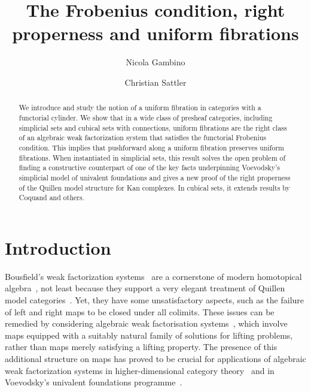 \documentclass[reqno,10pt,a4paper,oneside,draft]{amsart}
\title{The Frobenius condition, right properness \linebreak and uniform fibrations}
\begin{document}
\begin{abstract}
We introduce and study the notion of a uniform fibration in categories with a functorial cylinder.
We show that in a wide class of presheaf categories, including simplicial sets and cubical sets with connections, uniform fibrations are the right class of an algebraic weak factorization system that satisfies the functorial Frobenius condition.
This implies that pushforward along a uniform fibration preserves uniform fibrations.
When instantiated in simplicial sets, this result solves the open problem of finding a constructive counterpart of one of the key facts underpinning Voevodsky's simplicial model of univalent foundations and gives a new proof of the right properness of the Quillen model structure for Kan complexes.
In cubical sets, it extends results by Coquand and others.
\end{abstract}

\author{Nicola Gambino}
\address{School of Mathematics, University of Leeds, Leeds LS2 9JT, UK}

\author{Christian Sattler}
\address{School of Mathematics, University of Leeds, Leeds LS2 9JT, UK}


\maketitle

\tableofcontents


\section{Introduction}

Bousfield's weak factorization systems~\cite{bousfield-wfs} are a cornerstone of modern homotopical algebra~\cite{quillen-homotopical}, not least because they support a very elegant treatment of Quillen model categories~\cite{joyal-tierney-notes}.
Yet, they have some unsatisfactory aspects, such as the failure of left and right maps to be closed under all colimits.
These issues can be remedied by considering algebraic weak factorisation systems~\cite{garner:small-object-argument,grandis-tholen-nwfs}, which involve maps equipped with a suitably natural family of solutions for lifting problems, rather than maps merely satisfying a lifting property.
The presence of this additional structure on maps has proved to be crucial for applications of algebraic weak factorization systems in higher-dimensional category theory~\cite{batanin-cisinski-weber,garner:globular-operator-awfs,garner-homomorphisms} and in Voevodsky's univalent foundations programme~\cite{awodey-cubical,coquand-cubical-sets,cohen-et-al:cubicaltt,pitts-cubical-nominal,swan-awfs}.
\end{document}
